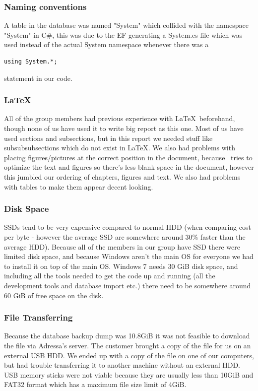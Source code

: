 \subsubsection{Naming conventions}
A table in the database was named "System" which collided with the namespace "System" in C\#, this was due to the EF generating a System.cs file which was used instead of the actual System namespace whenever there was a 
\begin{lstlisting}
using System.*;
\end{lstlisting}
statement in our code.

\subsubsection{\LaTeX}
All of the group members had previous experience with \LaTeX \ beforehand, though none of us have used it to write big report as this one. Most of us have used sections and subsections, but in this report we needed stuff like subsubsubsections which do not exist in \LaTeX . We also had problems with placing figures/pictures at the correct position in the document, because \LaTeXe \ tries to optimize the text and figures so there's less blank space in the document, however this jumbled our ordering of chapters, figures and text. We also had problems with tables to make them appear decent looking.


\subsubsection{Disk Space}
SSDs tend to be very expensive compared to normal HDD (when comparing cost per byte - however the average SSD are somewhere around 30\% faster than the average HDD). 
Because all of the members in our group have SSD there were limited disk space, and because Windows aren't the main OS for everyone we had to install it on top of the main OS. Windows 7 needs 30 GiB disk space, and including all the tools needed to get the code up and running (all the development tools and database import etc.) there need to be somewhere around 60 GiB of free space on the disk.

\subsubsection{File Transferring}
Because the database backup dump was 10.8GiB it was not feasible to download the file via Adressa's server. The customer brought a copy of the file for us on an external USB HDD. We ended up with a copy of the file on one of our computers, but had trouble transferring it to another machine without an external HDD. USB memory sticks were not viable because they are usually less than 10GiB and FAT32 format which has a maximum file size limit of 4GiB. 
